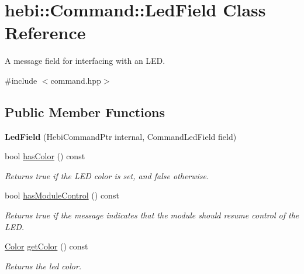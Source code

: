 \hypertarget{classhebi_1_1Command_1_1LedField}{}\section{hebi\+:\+:Command\+:\+:Led\+Field Class Reference}
\label{classhebi_1_1Command_1_1LedField}


A message field for interfacing with an L\+ED.  




{\ttfamily \#include $<$command.\+hpp$>$}

\subsection*{Public Member Functions}
\begin{DoxyCompactItemize}
\item 
\mbox{\label{classhebi_1_1Command_1_1LedField_a51c1a35f4ca0dc607f9627abebaaad5e}} 
{\bfseries Led\+Field} (Hebi\+Command\+Ptr internal, Command\+Led\+Field field)
\item 
\mbox{\label{classhebi_1_1Command_1_1LedField_a5526508a64b9bcbf81c221e7788f2ec1}} 
bool \hyperlink{classhebi_1_1Command_1_1LedField_a5526508a64b9bcbf81c221e7788f2ec1}{has\+Color} () const
\begin{DoxyCompactList}\small\item\em Returns true if the L\+ED color is set, and false otherwise. \end{DoxyCompactList}\item 
bool \hyperlink{classhebi_1_1Command_1_1LedField_aab7e6c19d8b4c5c5049789cd8690f2b0}{has\+Module\+Control} () const
\begin{DoxyCompactList}\small\item\em Returns true if the message indicates that the module should resume control of the L\+ED. \end{DoxyCompactList}\item 
\mbox{\label{classhebi_1_1Command_1_1LedField_a4fb110c8ea26153e927a4b2b3df89750}} 
\hyperlink{structhebi_1_1Color}{Color} \hyperlink{classhebi_1_1Command_1_1LedField_a4fb110c8ea26153e927a4b2b3df89750}{get\+Color} () const
\begin{DoxyCompactList}\small\item\em Returns the led color. \end{DoxyCompactList}\item 

\end{DoxyCompactItemize}
